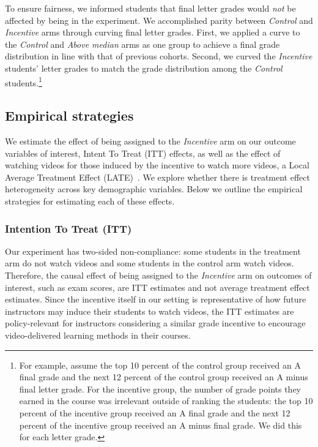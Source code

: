 \documentclass[12pt]{article}
\begin{document}
To ensure fairness, we informed students that final letter grades would \textit{not} be affected by being in the experiment.
We accomplished parity between \textit{Control} and \textit{Incentive} arms through curving final letter grades.
First, we applied a curve to the \textit{Control} and \textit{Above median} arms as one group to achieve a final grade distribution in line with that of previous cohorts.
Second, we curved the \textit{Incentive} students' letter grades to match the grade distribution among the \textit{Control} students.\footnote{For example, assume the top 10 percent of the control group received an A final grade and the next 12 percent of the control group received an A minus final letter grade.  For the incentive group, the number of grade points they earned in the course was irrelevant outside of ranking the students:  the top 10 percent of the incentive group received an A final grade and the next 12 percent of the incentive group received an A minus final grade.  We did this for each letter grade.}


\subsection{Empirical strategies} \label{subsec:empiricalstrat}

We estimate the effect of being assigned to the \textit{Incentive} arm on our outcome variables of interest, Intent To Treat (ITT) effects, as well as the effect of watching videos for those induced by the incentive to watch more videos, a Local Average Treatment Effect (LATE)~\parencite{ir2015}.
We explore whether there is treatment effect heterogeneity across key demographic variables.
Below we outline the empirical strategies for estimating each of these effects.

\subsubsection{Intention To Treat (ITT)}

Our experiment has two-sided non-compliance: some students in the treatment arm do not watch videos and some students in the control arm watch videos.
Therefore, the causal effect of being assigned to the \textit{Incentive} arm on outcomes of interest, such as exam scores, are ITT estimates and not average treatment effect estimates.
Since the incentive itself in our setting is representative of how future instructors may induce their students to watch videos, the ITT estimates are policy-relevant for instructors considering a similar grade incentive to encourage video-delivered learning methods in their courses.
\end{document}
